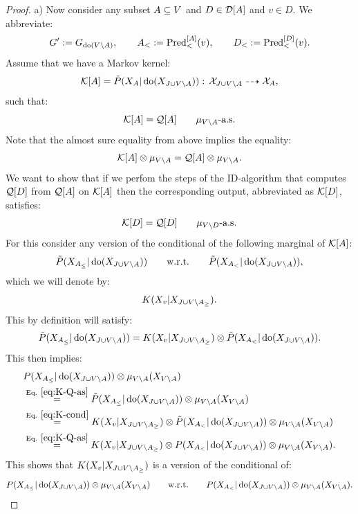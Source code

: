 \begin{Thm}
\begin{proof}
        a) Now consider any subset $A \subseteq V$ and $D \in \mathcal{D}[A]$ and $v \in D$.  We abbreviate:
        \[ G':= G_{\operatorname{do}(V \setminus A)}, \qquad A_<:=\mathrm{Pred}^{[A]}_<(v), \qquad D_<:=\mathrm{Pred}^{[D]}_<(v). \]
         Assume that we have a Markov kernel:
        \[ \mathcal{K}[A]=\tilde P(X_{A}|\operatorname{do}(X_{J \cup V \setminus A})) :\, \mathcal{X}_{J \cup V \setminus A} \dashrightarrow \mathcal{X}_A,  \]
        such that:
        \[ \mathcal{K}[A] = \mathcal{Q}[A]\qquad \mu_{V\setminus A}\text{-a.s.}  \]
         Note that the almost sure equality from above implies the equality:
        \begin{align}
            \mathcal{K}[A] \otimes \mu_{V\setminus A} = \mathcal{Q}[A]\otimes \mu_{V\setminus A}. \label{eq:K-Q-as} 
        \end{align}
        We want to show that if we perfom the steps of the ID-algorithm that computes $\mathcal{Q}[D]$ from $\mathcal{Q}[A]$
        on $\mathcal{K}[A]$ then the corresponding output, abbreviated as $\mathcal{K}[D]$, satisfies:
        \[ \mathcal{K}[D] = \mathcal{Q}[D]\qquad \mu_{V\setminus D}\text{-a.s.}  \]
        For this consider any version of the conditional of the following marginal of $\mathcal{K}[A]$:
        \[ \tilde P(X_{A_\le}|\operatorname{do}(X_{J \cup V \setminus A}))  \qquad \text{w.r.t.} \qquad \tilde P(X_{A_<}|\operatorname{do}(X_{J \cup V \setminus A})), \] 
        which we will denote by:
        \[ K(X_v|X_{J \cup V \setminus A_\ge}). \]
        This by definition will satisfy:
        \begin{align}
        \tilde P(X_{A_\le}|\operatorname{do}(X_{J \cup V \setminus A})) =  K(X_v|X_{J \cup V \setminus A_\ge}) \otimes \tilde P(X_{A_<}|\operatorname{do}(X_{J \cup V \setminus A})).  \label{eq:K-cond}  \end{align}
        This then implies:
        \begin{align*}
           & P(X_{A_\le}|\operatorname{do}(X_{J \cup V \setminus A})) \otimes \mu_{V \setminus A}(X_{V \setminus A}) \\
           & \stackrel{\text{Eq. }\ref{eq:K-Q-as}}{=} \tilde P(X_{A_\le}|\operatorname{do}(X_{J \cup V \setminus A})) \otimes \mu_{V \setminus A}(X_{V \setminus A}) \\
           & \stackrel{\text{Eq. }\ref{eq:K-cond}}{=} K(X_v|X_{J \cup V \setminus A_\ge}) \otimes \tilde P(X_{A_<}|\operatorname{do}(X_{J \cup V \setminus A})) \otimes \mu_{V \setminus A}(X_{V \setminus A}) \\
           & \stackrel{\text{Eq. }\ref{eq:K-Q-as}}{=} K(X_v|X_{J \cup V \setminus A_\ge}) \otimes  P(X_{A_<}|\operatorname{do}(X_{J \cup V \setminus A})) \otimes \mu_{V \setminus A}(X_{V \setminus A}).
        \end{align*}
        This shows that $K(X_v|X_{J \cup V \setminus A_\ge})$ is a version of the conditional of:
        \[  P(X_{A_\le}|\operatorname{do}(X_{J \cup V \setminus A})) \otimes \mu_{V \setminus A}(X_{V \setminus A})  \qquad \text{w.r.t.} \qquad  P(X_{A_<}|\operatorname{do}(X_{J \cup V \setminus A})) \otimes \mu_{V \setminus A}(X_{V \setminus A}). \]

\end{proof}
\end{Thm}
